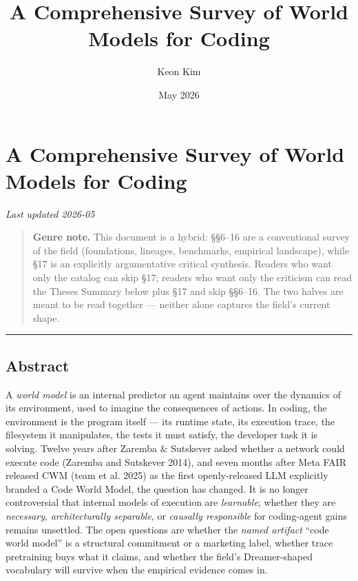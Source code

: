 \documentclass{article}
\title{A Comprehensive Survey of World Models for Coding}
\author{Keon Kim}
\date{May 2026}
\begin{document}
\maketitle


{\hypersetup{linkcolor=black}
\setcounter{tocdepth}{2}
\tableofcontents
}

\hypertarget{a-comprehensive-survey-of-world-models-for-coding}{%
\section{A Comprehensive Survey of World Models for
Coding}\label{a-comprehensive-survey-of-world-models-for-coding}}

\emph{Last updated 2026-05}

\begin{quote}
\textbf{Genre note.} This document is a hybrid: §§6--16 are a
conventional survey of the field (foundations, lineages, benchmarks,
empirical landscape), while §17 is an explicitly argumentative critical
synthesis. Readers who want only the catalog can skip §17; readers who
want only the criticism can read the Theses Summary below plus §17 and
skip §§6--16. The two halves are meant to be read together --- neither
alone captures the field's current shape.
\end{quote}

\begin{center}\rule{0.5\linewidth}{0.5pt}\end{center}

\hypertarget{abstract}{%
\subsection{Abstract}\label{abstract}}

A \emph{world model} is an internal predictor an agent maintains over
the dynamics of its environment, used to imagine the consequences of
actions. In coding, the environment is the program itself --- its
runtime state, its execution trace, the filesystem it manipulates, the
tests it must satisfy, the developer task it is solving. Twelve years
after Zaremba \& Sutskever asked whether a network could execute code
(Zaremba and Sutskever 2014), and seven months after Meta FAIR released
CWM (team et al. 2025) as the first openly-released LLM explicitly
branded a Code World Model, the question has changed. It is no longer
controversial that internal models of execution are \emph{learnable};
whether they are \emph{necessary}, \emph{architecturally separable}, or
\emph{causally responsible} for coding-agent gains remains unsettled.
The open questions are whether the \emph{named artifact} ``code world
model'' is a structural commitment or a marketing label, whether trace
pretraining buys what it claims, and whether the field's Dreamer-shaped
vocabulary will survive when the empirical evidence comes in.
\end{document}

